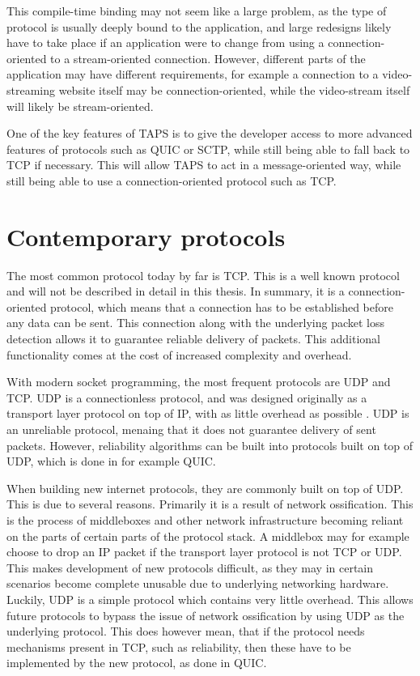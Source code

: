 This compile-time binding may not seem like a large problem, as
the type of protocol is usually deeply bound
to the application, and large redesigns likely have to take
place if an application were to change from using a
connection-oriented to a stream-oriented connection. However,
different parts of the application may have different
requirements, for example a connection to a video-streaming
website itself may be connection-oriented, while the
video-stream itself will likely be stream-oriented.

One of the key features of TAPS is to give the developer access
to more advanced features of protocols such as QUIC or SCTP,
while still being able to fall back to TCP if necessary. This
will allow TAPS to act in a message-oriented way, while still
being able to use a connection-oriented protocol such as TCP.

\section{Contemporary protocols}
The most common protocol today by far is TCP. This is a
well known protocol and will not be described in detail in
this thesis. In summary, it is a connection-oriented protocol,
which means that a connection has to be established before 
any data can be sent. This connection along with the underlying
packet loss detection allows it to
guarantee reliable delivery of packets. 
This additional
functionality comes at the cost of
increased complexity and overhead.

With modern socket programming, the most frequent protocols
are UDP and TCP. UDP is a connectionless protocol, and was
designed originally as a transport layer protocol on top of
IP, with as little overhead as possible \cite{postelUserDatagramProtocol1980}.
UDP is an unreliable protocol, menaing that it does not guarantee
delivery of sent packets. However, reliability algorithms can
be built into protocols built on top of UDP, which is done in
for example QUIC. 

When building new internet protocols, they are commonly built
on top of UDP. This is due to several reasons. Primarily it
is a result of network ossification. This is the process
of middleboxes and other network infrastructure becoming
reliant on the parts of certain parts of the protocol stack.
A middlebox may for example choose to drop an IP packet if
the transport layer protocol is not TCP or UDP. This makes
development of new protocols difficult, as they may in certain
scenarios become complete unusable due to underlying networking
hardware. Luckily, UDP is a simple protocol which contains
very little overhead. This allows future protocols to bypass
the issue of network ossification by using UDP as the underlying
protocol. This does however mean, that if the protocol needs
mechanisms present in TCP, such as reliability, then these have
to be implemented by the new protocol, as done in QUIC.

